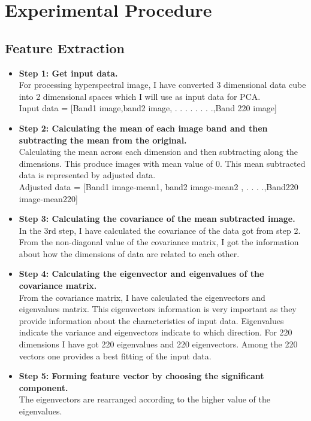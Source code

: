 \documentclass[document.tex]{subfiles}
\begin{document}
\section{Experimental Procedure}

\subsection{Feature Extraction}
\begin{itemize}
	\item \textbf{Step 1: Get input data. }\\
	For processing hyperspectral image, I have converted 3 dimensional data cube into 2 dimensional spaces which I will use
	as input data for PCA.\\
	Input data = [Band1 image,band2 image, . . . . . . . .,Band 220 image]
	\item \textbf{Step 2: Calculating the mean of each image band and then subtracting
		the mean from the original.}\\
	Calculating the mean across each dimension and then subtracting along the dimensions. This produce images with mean value of 0. This mean subtracted data is
	represented by adjusted data.\\ Adjusted data = [Band1 image-mean1, band2 image-mean2 , . . . .,Band220 image-mean220]
	\item \textbf{Step 3: Calculating the covariance of the mean subtracted image.} \\
	In the 3rd step, I have calculated the covariance of the data got from step 2. From
	the non-diagonal value of the covariance matrix, I got the information about how
	the dimensions of data are related to each other.
	\item \textbf{Step 4: Calculating the eigenvector and eigenvalues of the covariance matrix.} \\
	From the covariance matrix, I have calculated the eigenvectors and eigenvalues
	matrix. This eigenvectors information is very important as they provide information
	about the characteristics of input data. Eigenvalues indicate the variance and
	eigenvectors indicate to which direction. For 220 dimensions I have got 220 eigenvalues and 220 eigenvectors. Among the 220 vectors one provides a best fitting of
	the input data.
	\item \textbf{Step 5: Forming feature vector by choosing the significant component.}\\
	The eigenvectors are rearranged according to the higher value of the eigenvalues.

\end{itemize}
\end{document}
